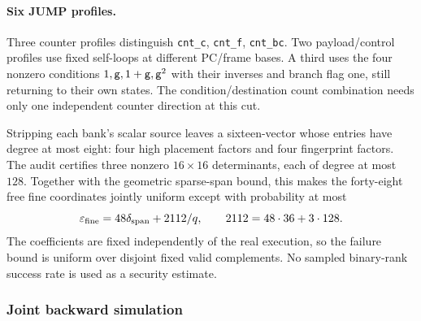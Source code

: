 \paragraph{Six JUMP profiles.} Three counter profiles distinguish \texttt{cnt\_c}, \texttt{cnt\_f}, \texttt{cnt\_bc}. Two payload/control profiles use fixed self-loops at different PC/frame bases. A third uses the four nonzero conditions $1,\mathsf{g},1+\mathsf{g},\mathsf{g}^2$ with their inverses and branch flag one, still returning to their own states. The condition/destination count combination needs only one independent counter direction at this cut.

Stripping each bank's scalar source leaves a sixteen-vector whose entries have degree at most eight: four high placement factors and four fingerprint factors. The audit certifies three nonzero $16\times16$ determinants, each of degree at most $128$. Together with the geometric sparse-span bound, this makes the forty-eight free fine coordinates jointly uniform except with probability at most
\[
 \varepsilon_{\rm fine}=48\delta_{\rm span}+2112/q,
 \qquad 2112=48\cdot36+3\cdot128.
\]
The coefficients are fixed independently of the real execution, so the failure bound is uniform over disjoint fixed valid complements. No sampled binary-rank success rate is used as a security estimate.

\subsubsection{Joint backward simulation}

